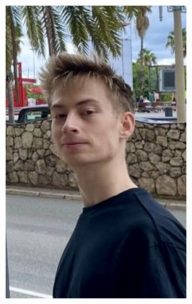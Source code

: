\documentclass[10pt,a4paper]{article}
\newlength{\photoH}
\begin{document}
\pagestyle{empty}
\small
\color{textgray}

\begin{paracol}{2}

\color{white}\raggedright\normalsize

\begin{minipage}[t][\photoH][t]{\linewidth}
  \includegraphics[height=\photoH,width=\linewidth,keepaspectratio]{cv_test.jpeg}
\end{minipage}



\end{paracol}
\end{document}
